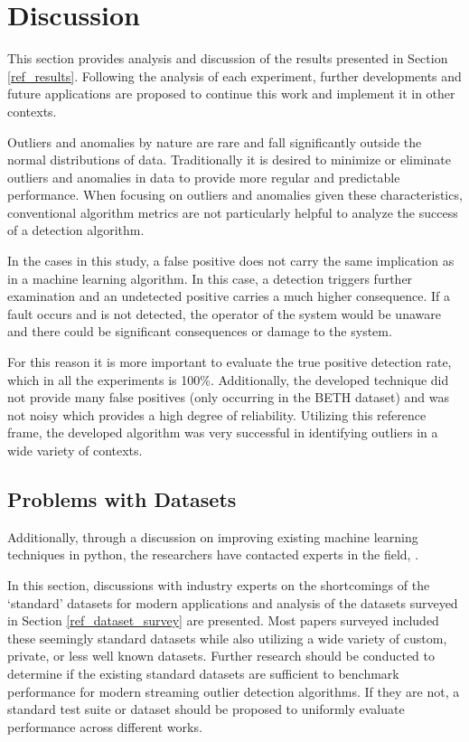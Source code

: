 \section{Discussion}
\label{sec:discussion}
This section provides analysis and discussion of the results presented in Section \ref{ref_results}. Following the analysis of each experiment, further developments and future applications are proposed to continue this work and implement it in other contexts.

Outliers and anomalies by nature are rare and fall significantly outside the normal distributions of data. Traditionally it is desired to minimize or eliminate outliers and anomalies in data to provide more regular and predictable performance. When focusing on outliers and anomalies given these characteristics, conventional algorithm metrics are not particularly helpful to analyze the success of a detection algorithm.

In the cases in this study, a false positive does not carry the same implication as in a machine learning algorithm. In this case, a detection triggers further examination and an undetected positive carries a much higher consequence. If a fault occurs and is not detected, the operator of the system would be unaware and there could be significant consequences or damage to the system.

For this reason it is more important to evaluate the true positive detection rate, which in all the experiments is 100\%. Additionally, the developed technique did not provide many false positives (only occurring in the BETH dataset) and was not noisy which provides a high degree of reliability. Utilizing this reference frame, the developed algorithm was very successful in identifying outliers in a wide variety of contexts.

\subsection{Problems with Datasets}
Additionally, through a discussion on improving existing machine learning techniques in python, the researchers have contacted experts in the field,  .

In this section, discussions with industry experts on the shortcomings of the `standard' datasets for modern applications and analysis of the datasets surveyed in Section \ref{ref_dataset_survey} are presented. Most papers surveyed included these seemingly standard datasets while also utilizing a wide variety of custom, private, or less well known datasets. Further research should be conducted to determine if the existing standard datasets are sufficient to benchmark performance for modern streaming outlier detection algorithms. If they are not, a standard test suite or dataset should be proposed to uniformly evaluate performance across different works.


